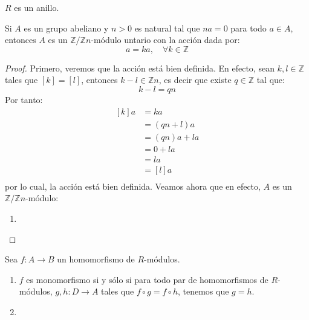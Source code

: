 \documentclass[12pt]{report}
\newcounter{it}
\theoremstyle{largebreak}
\newcommand\cf[3]{\ensuremath{#1:#2\rightarrow#3}}
\begin{document}
    \begin{obs}
        $R$ es un anillo.
    \end{obs}

    \begin{excer}
        Si $A$ es un grupo abeliano y $n>0$ es natural tal que $na=0$ para todo $a\in A$, entonces $A$ es un $\mathbb{Z}/\mathbb{Z}n$-módulo untario con la acción dada por:
        \begin{equation*}
            [k]a=ka,\quad\forall k\in\mathbb{Z}
        \end{equation*}
    \end{excer}

    \begin{proof}
        Primero, veremos que la acción está bien definida. En efecto, sean $k,l\in\mathbb{Z}$ tales que $[k]=[l]$, entonces $k-l\in\mathbb{Z}n$, es decir que existe $q\in\mathbb{Z}$ tal que:
        \begin{equation*}
            k-l=qn
        \end{equation*}
        Por tanto:
        \begin{equation*}
            \begin{split}
                [k]a&=ka\\
                &=(qn+l)a\\
                &=(qn)a+la\\
                &=0+la\\
                &=la\\
                &=[l]a\\
            \end{split}
        \end{equation*}
        por lo cual, la acción está bien definida. Veamos ahora que en efecto, $A$ es un $\mathbb{Z}/\mathbb{Z}n$-módulo:
        \begin{enumerate}[label = \textit{(\alph*)}]
            \item 
        \end{enumerate}
    \end{proof}

    \begin{excer}
        Sea $\cf{f}{A}{B}$ un homomorfismo de $R$-módulos.
        \begin{enumerate}[label = \textit{(\alph*)}]
            \item $f$ es monomorfismo si y sólo si para todo par de homomorfismos de $R$-módulos, $\cf{g,h}{D}{A}$ tales que $f\circ g=f\circ h$, tenemos que $g=h$.
            \item 
        \end{enumerate}
    \end{excer}
\end{document}
